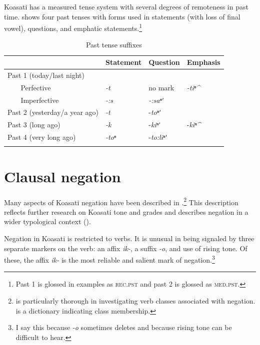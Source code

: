 \documentclass[output=paper,colorlinks,citecolor=brown]{langscibook}
\begin{document}
Koasati has a measured tense system with several degrees of remoteness in past time.  shows four past tenses with forms used in statements (with loss of final vowel), questions, and emphatic statements.\footnote{Past 1 is glossed in examples as \textsc{rec.pst} and past 2 is glossed as \textsc{med.pst}.}


\begin{table}
\caption{Past tense suffixes}
\label{tab:koa:1}
\begin{tabular}{lllll}
\lsptoprule
& & Statement & Question & Emphasis \\ 
\midrule 
\multicolumn{2}{l}{Past 1 (today/last night)} &&& \\
& Perfective                      & \textit{-t}    & no mark   & \textit{-tiⁿ\^{}} \\
& Imperfective                    & \textit{-:s}   &  \textit{-:saⁿʹ}   & \\
\multicolumn{2}{l}{Past 2 (yesterday/a year ago)}   &  \textit{-t}   &  -\textit{toⁿʹ}    &\\
\multicolumn{2}{l}{Past 3 (long ago)}              & \textit{-k}    & -\textit{kiⁿʹ}     & -\textit{kiⁿ\^{}} \\
\multicolumn{2}{l}{Past 4 (very long ago)}          & \textit{-toⁿ} & -\textit{to:liⁿʹ} & \\
\lspbottomrule
\end{tabular}
\end{table}


\section{Clausal negation}\label{sec:koa:2}

Many aspects of Koasati negation have been described in \citet{Kimball1991}.\footnote{\citet{Kimball1991} is particularly thorough in investigating verb classes associated with negation. \citet{Kimball1994} is a dictionary indicating class membership.} This description reflects further research on Koasati tone and grades and describes negation in a wider typological context (\citealt{Dahl1979,Miestamo2005,chapters/questionnaire}).

Negation in Koasati is restricted to verbs. It is unusual in being signaled by three separate markers on the verb: an affix \textit{ik-}, a suffix \textit{-o}, and use of rising tone. Of these, the affix \textit{ik-} is the most reliable and salient mark of negation.\footnote{I say this because \textit{{}-o} sometimes deletes and because rising tone can be difficult to hear.}
\end{document}

